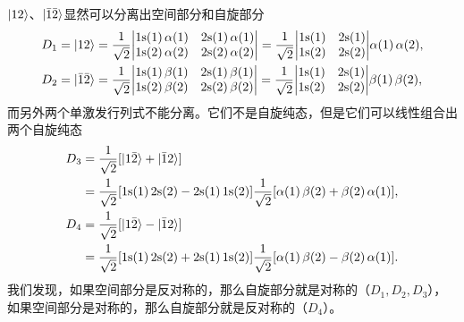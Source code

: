 $ \ket{12}$、$\ket{\bar{1}\bar{2}} $显然可以分离出空间部分和自旋部分
\begin{align}
    &D_1= \ket{12} = \frac{1}{\sqrt{2}} \mqty| \mathrm{1s}(1)\,\alpha(1) & \mathrm{2s}(1)\,\alpha(1) \\ \mathrm{1s}(2)\,\alpha(2) & \mathrm{2s}(2)\,\alpha(2) | 
    = \frac{1}{\sqrt{2}} \mqty| \mathrm{1s}(1) & \mathrm{2s}(1) \\ \mathrm{1s}(2) & \mathrm{2s}(2) |\alpha(1)\,\alpha(2), \\
    &D_2 = \ket{\bar{1}\bar{2}}  = 
    \frac1{\sqrt2}\mqty| \mathrm{1s}(1)\,\beta(1) & \mathrm{2s}(1)\,\beta(1) \\ \mathrm{1s}(2)\,\beta(2) & \mathrm{2s}(2)\,\beta(2) |
    = \frac{1}{\sqrt{2}} \mqty| \mathrm{1s}(1) & \mathrm{2s}(1) \\ \mathrm{1s}(2) & \mathrm{2s}(2) |\beta(1)\,\beta(2), 
\end{align}
而另外两个单激发行列式不能分离。它们不是自旋纯态，但是它们可以线性组合出两个自旋纯态
\begin{align}
    D_3 
    &= \frac{1}{\sqrt{2}} [\ket{1\bar{2}} + \ket{\bar{1}2}] \\
    &= \frac{1}{\sqrt{2}} [\mathrm{1s}(1)\,\mathrm{2s}(2) - \mathrm{2s}(1)\,\mathrm{1s}(2)] \frac{1}{\sqrt{2}} [\alpha(1)\,\beta(2) + \beta(2)\,\alpha(1)], \\
    D_4 
    &=\frac{1}{\sqrt{2}} [\ket{1\bar{2}} - \ket{\bar{1}2}] \\
    &= \frac{1}{\sqrt{2}} [\mathrm{1s}(1)\,\mathrm{2s}(2) + \mathrm{2s}(1)\,\mathrm{1s}(2)] \frac{1}{\sqrt{2}} [\alpha(1)\,\beta(2) - \beta(2)\,\alpha(1)].  
\end{align}
我们发现，如果空间部分是反对称的，那么自旋部分就是对称的（$D_1, D_2, D_3$），如果空间部分是对称的，那么自旋部分就是反对称的（$D_4$）。

